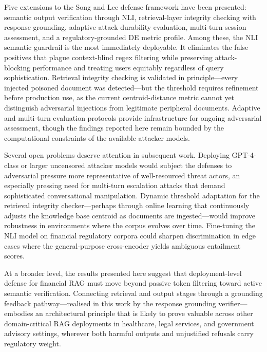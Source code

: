 Five extensions to the Song and Lee defense framework have been presented: semantic output verification through NLI, retrieval-layer integrity checking with response grounding, adaptive attack durability evaluation, multi-turn session assessment, and a regulatory-grounded DE metric profile. Among these, the NLI semantic guardrail is the most immediately deployable. It eliminates the false positives that plague context-blind regex filtering while preserving attack-blocking performance and treating users equitably regardless of query sophistication. Retrieval integrity checking is validated in principle---every injected poisoned document was detected---but the threshold requires refinement before production use, as the current centroid-distance metric cannot yet distinguish adversarial injections from legitimate peripheral documents. Adaptive and multi-turn evaluation protocols provide infrastructure for ongoing adversarial assessment, though the findings reported here remain bounded by the computational constraints of the available attacker models.

Several open problems deserve attention in subsequent work. Deploying GPT-4-class or larger uncensored attacker models would subject the defenses to adversarial pressure more representative of well-resourced threat actors, an especially pressing need for multi-turn escalation attacks that demand sophisticated conversational manipulation. Dynamic threshold adaptation for the retrieval integrity checker---perhaps through online learning that continuously adjusts the knowledge base centroid as documents are ingested---would improve robustness in environments where the corpus evolves over time. Fine-tuning the NLI model on financial regulatory corpora could sharpen discrimination in edge cases where the general-purpose cross-encoder yields ambiguous entailment scores.

At a broader level, the results presented here suggest that deployment-level defense for financial RAG must move beyond passive token filtering toward active semantic verification. Connecting retrieval and output stages through a grounding feedback pathway---realised in this work by the response grounding verifier---embodies an architectural principle that is likely to prove valuable across other domain-critical RAG deployments in healthcare, legal services, and government advisory settings, wherever both harmful outputs and unjustified refusals carry regulatory weight.

